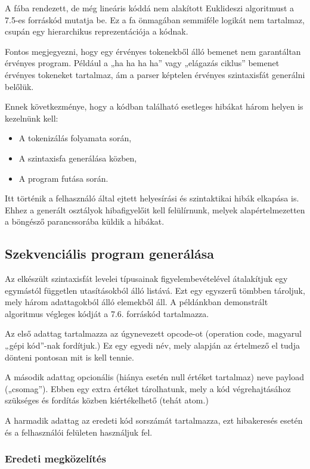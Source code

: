 A fába rendezett, de még lineáris kóddá nem alakított Euklideszi algoritmust a 7.5-es forráskód mutatja be. Ez a fa önmagában semmiféle logikát nem tartalmaz, csupán egy hierarchikus reprezentációja a kódnak.

Fontos megjegyezni, hogy egy érvényes tokenekből álló bemenet nem garantáltan érvényes program. Például a „ha ha ha ha” vagy „elágazás ciklus” bemenet érvényes tokeneket tartalmaz, ám a parser képtelen érvényes szintaxisfát generálni belőlük.

Ennek következménye, hogy a kódban található esetleges hibákat három helyen is kezelnünk kell:

\begin{itemize}
    \item A tokenizálás folyamata során,
    \item A szintaxisfa generálása közben,
    \item A program futása során.
\end{itemize}

Itt történik a felhasználó által ejtett helyesírási és szintaktikai hibák elkapása is. Ehhez a generált osztályok hibafigyelőit kell felülírnunk, melyek alapértelmezetten a böngésző parancssorába küldik a hibákat.

\subsection{Szekvenciális program generálása}

Az elkészült szintaxisfát levelei típusainak figyelembevételével átalakítjuk egy egymástól független utasításokból álló listává. Ezt egy egyszerű tömbben tároljuk, mely három adattagokból álló elemekből áll. A példánkban demonstrált algoritmus végleges kódját a 7.6. forráskód tartalmazza.

Az első adattag tartalmazza az úgynevezett opcode-ot (operation code, magyarul „gépi kód”-nak fordítjuk.) Ez egy egyedi név, mely alapján az értelmező el tudja dönteni pontosan mit is kell tennie.

A második adattag opcionális (hiánya esetén null értéket tartalmaz) neve payload („csomag”). Ebben egy extra értéket tárolhatunk, mely a kód végrehajtásához szükséges és fordítás közben kiértékelhető (tehát atom.)

A harmadik adattag az eredeti kód sorszámát tartalmazza, ezt hibakeresés esetén és a felhasználói felületen használjuk fel.

\subsubsection{Eredeti megközelítés}


